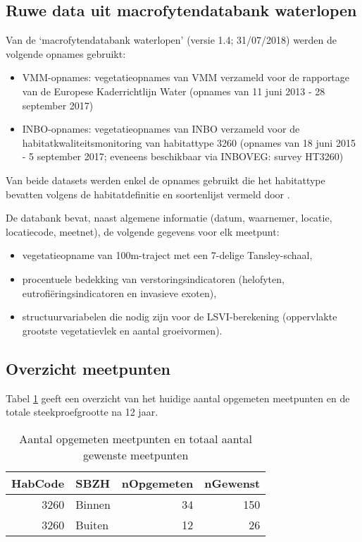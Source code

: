 \documentclass[twoside]{extreport}
\begin{document}
\subsection{Ruwe data uit macrofytendatabank
waterlopen}\label{ruwe-data-uit-macrofytendatabank-waterlopen}

Van de `macrofytendatabank waterlopen' (versie 1.4; 31/07/2018) werden
de volgende opnames gebruikt:

\begin{itemize}
\item
  VMM-opnames: vegetatieopnames van VMM verzameld voor de rapportage van
  de Europese Kaderrichtlijn Water (opnames van 11 juni 2013 - 28
  september 2017)
\item
  INBO-opnames: vegetatieopnames van INBO verzameld voor de
  habitatkwaliteitsmonitoring van habitattype 3260 (opnames van 18 juni
  2015 - 5 september 2017; eveneens beschikbaar via INBOVEG: survey
  HT3260)
\end{itemize}

Van beide datasets werden enkel de opnames gebruikt die het habitattype
bevatten volgens de habitatdefinitie en soortenlijst vermeld door
\citep{Leyssen2018}.

De databank bevat, naast algemene informatie (datum, waarnemer, locatie,
locatiecode, meetnet), de volgende gegevens voor elk meetpunt:

\begin{itemize}
\tightlist
\item
  vegetatieopname van 100m-traject met een 7-delige Tansley-schaal,
\item
  procentuele bedekking van verstoringsindicatoren (helofyten,
  eutrofiëringsindicatoren en invasieve exoten),
\item
  structuurvariabelen die nodig zijn voor de LSVI-berekening
  (oppervlakte grootste vegetatievlek en aantal groeivormen).
\end{itemize}

\subsection{Overzicht meetpunten}\label{overzicht-meetpunten-6}

Tabel \ref{tab:tabelMeetpuntenRivier} geeft een overzicht van het
huidige aantal opgemeten meetpunten en de totale steekproefgrootte na 12
jaar.

\begin{table}[!h]

\caption{\label{tab:tabelMeetpuntenRivier}Aantal opgemeten meetpunten en totaal aantal gewenste meetpunten}
\centering
\begin{tabular}{rlrr}
\toprule
HabCode & SBZH & nOpgemeten & nGewenst\\
\midrule
3260 & Binnen & 34 & 150\\
3260 & Buiten & 12 & 26\\
\bottomrule
\end{tabular}
\end{table}
\end{document}
